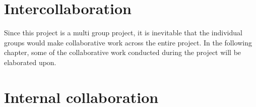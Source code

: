 \chapter{Intercollaboration}\label{CAP:Intercollaboration}
Since this project is a multi group project, it is inevitable that the individual groups would make collaborative work across the entire project. 
In the following chapter, some of the collaborative work conducted during the project will be elaborated upon. 

\chapter{Internal collaboration}\label{CAP:InternalCollaboration}


